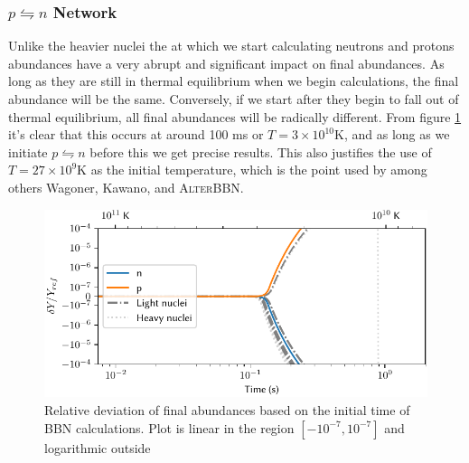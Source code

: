 \subsubsection{$p\leftrightharpoons n$ Network}
Unlike the heavier nuclei the at which we start calculating neutrons and protons abundances have a very abrupt and significant impact on final abundances. As long as they are still in thermal equilibrium when we begin calculations, the final abundance will be the same. Conversely, if we start after they begin to fall out of thermal equilibrium, all final abundances will be radically different. From figure \ref{fig:npnettime} it's clear that this occurs at around 100 ms or $T=3\times10^{10}$K, and as long as we initiate $p\leftrightharpoons n$ before this we get precise results. This also justifies the use of $T=27\times10^9$K as the initial temperature, which is the point used by among others Wagoner, Kawano, and \textsc{AlterBBN}.
\begin{figure}[ht]
    \includegraphics[width=5.1in]{figures/npnettime.pdf}
    \caption{Relative deviation of final abundances based on the initial time of BBN calculations. Plot is linear in the region $[-10^{-7},10^{-7}]$ and logarithmic outside}
    \label{fig:npnettime}
\end{figure}



